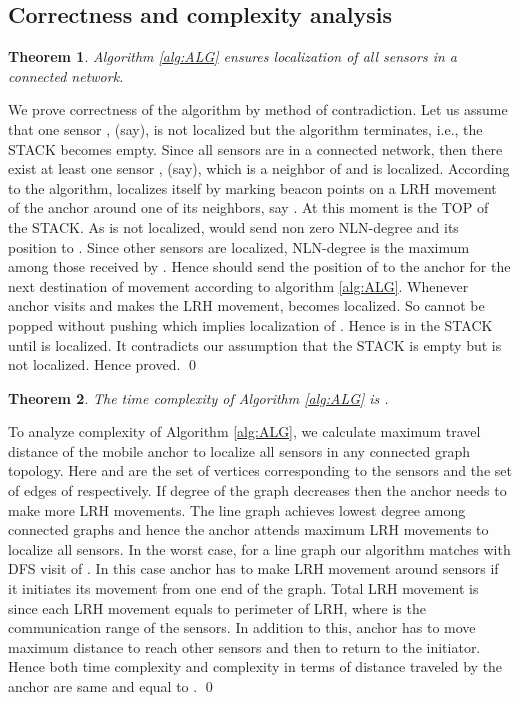 \documentclass[preprint,11pt]{elsarticle}
\newtheorem{theorem}{Theorem}
\newenvironment{proof}{\noindent{\bf Proof: }}{\qed \smallbreak}
\begin{document}
\subsection{Correctness and complexity analysis}
\begin{theorem}
Algorithm \ref{alg:ALG} ensures localization of all sensors in a connected network.\label{th:correctness}
\end{theorem}
\begin{proof}
We prove correctness of the algorithm by  method of contradiction. Let us assume that one sensor , (say), is not localized but the algorithm terminates, i.e., the STACK becomes empty. Since all sensors are in a connected network, then there exist at least one sensor , (say), which is a neighbor of  and is localized. According to the algorithm,  localizes itself by marking beacon points on a LRH movement of the anchor around one of its neighbors, say . At this moment  is the TOP of the STACK. As  is not localized,  would send non zero NLN-degree and its position to . Since other sensors are localized, NLN-degree is the maximum among those received by . Hence  should send the position of  to the anchor for the next destination of movement according to algorithm \ref{alg:ALG}. Whenever anchor visits  and makes the LRH movement,  becomes localized. So  cannot be popped without pushing  which implies localization of . Hence  is in the STACK until  is localized. It contradicts our assumption that the STACK is empty but  is not localized. Hence proved.
\end{proof}
\begin{theorem}
The time complexity of Algorithm \ref{alg:ALG} is .\label{th:timecomplexity}
\end{theorem}
\begin{proof}
To analyze complexity of Algorithm \ref{alg:ALG}, we calculate maximum travel distance of the mobile anchor to localize all sensors in any connected graph  topology. Here  and  are the set of vertices corresponding to the sensors and the set of edges of  respectively. If degree of the graph decreases then the anchor needs to make more LRH movements. The line graph achieves lowest degree among connected graphs and hence the anchor attends maximum LRH movements to localize all sensors. In the worst case, for a line graph our algorithm matches with DFS visit of . In this case anchor has to make LRH movement around  sensors if it initiates its movement from one end of the graph. Total LRH movement is  since each LRH movement equals to perimeter  of LRH, where  is the communication range of the sensors. In addition to this, anchor has to move maximum  distance to reach other sensors and then to return to the initiator.  Hence both time complexity and complexity in terms of distance traveled by the anchor are same and equal to .
\end{proof}
\end{document}
